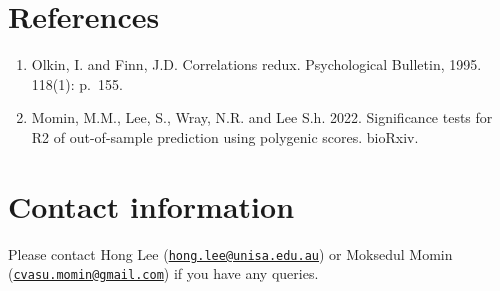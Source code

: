 \documentclass[
]{article}
\providecommand{\tightlist}{%
  \setlength{\itemsep}{0pt}\setlength{\parskip}{0pt}}
\begin{document}
\hypertarget{references}{%
\section{References}\label{references}}

\begin{enumerate}
\def\labelenumi{\arabic{enumi}.}
\tightlist
\item
  Olkin, I. and Finn, J.D. Correlations redux. Psychological Bulletin,
  1995. 118(1): p.~155.
\item
  Momin, M.M., Lee, S., Wray, N.R. and Lee S.h. 2022. Significance tests
  for R2 of out-of-sample prediction using polygenic scores. bioRxiv.
\end{enumerate}

\hypertarget{contact-information}{%
\section{Contact information}\label{contact-information}}

Please contact Hong Lee
(\href{mailto:hong.lee@unisa.edu.au}{\nolinkurl{hong.lee@unisa.edu.au}})
or Moksedul Momin
(\href{mailto:cvasu.momin@gmail.com}{\nolinkurl{cvasu.momin@gmail.com}})
if you have any queries.
\end{document}
